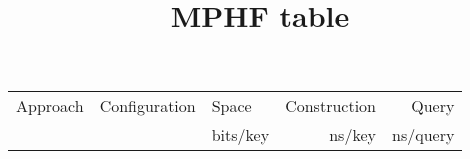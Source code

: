 \documentclass{article}
\title{MPHF table}
\date{}
\begin{document}
\addtolength\tabcolsep{-0.5pt}
\newcommand{\mr}[1]{\multirow{2}{*}{#1}}
\begin{centering}
\begin{tabular}[t]{lll rr}
    \toprule
    Approach & Configuration & Space    & Construction & Query \\
             &               & bits/key & ns/key       & ns/query \\ \midrule


    \bottomrule
\end{tabular}
\end{centering}
\end{document}

